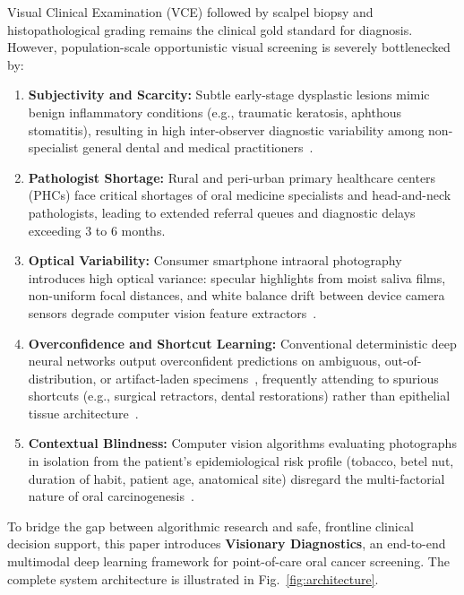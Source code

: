 \documentclass[journal]{IEEEtran}
\begin{document}
Visual Clinical Examination (VCE) followed by scalpel biopsy and histopathological grading remains the clinical gold standard for diagnosis. However, population-scale opportunistic visual screening is severely bottlenecked by:
\begin{enumerate}
    \item \textbf{Subjectivity and Scarcity:} Subtle early-stage dysplastic lesions mimic benign inflammatory conditions (e.g., traumatic keratosis, aphthous stomatitis), resulting in high inter-observer diagnostic variability among non-specialist general dental and medical practitioners~\cite{vanderwaal2020screening}.
    \item \textbf{Pathologist Shortage:} Rural and peri-urban primary healthcare centers (PHCs) face critical shortages of oral medicine specialists and head-and-neck pathologists, leading to extended referral queues and diagnostic delays exceeding 3 to 6 months.
    \item \textbf{Optical Variability:} Consumer smartphone intraoral photography introduces high optical variance: specular highlights from moist saliva films, non-uniform focal distances, and white balance drift between device camera sensors degrade computer vision feature extractors~\cite{reinhard2001color}.
    \item \textbf{Overconfidence and Shortcut Learning:} Conventional deterministic deep neural networks output overconfident predictions on ambiguous, out-of-distribution, or artifact-laden specimens~\cite{guo2017calibration}, frequently attending to spurious shortcuts (e.g., surgical retractors, dental restorations) rather than epithelial tissue architecture~\cite{geirhos2020shortcut}.
    \item \textbf{Contextual Blindness:} Computer vision algorithms evaluating photographs in isolation from the patient's epidemiological risk profile (tobacco, betel nut, duration of habit, patient age, anatomical site) disregard the multi-factorial nature of oral carcinogenesis~\cite{warnakulasuriya2009global}.
\end{enumerate}

To bridge the gap between algorithmic research and safe, frontline clinical decision support, this paper introduces \textbf{Visionary Diagnostics}, an end-to-end multimodal deep learning framework for point-of-care oral cancer screening. The complete system architecture is illustrated in Fig.~\ref{fig:architecture}.
\end{document}
